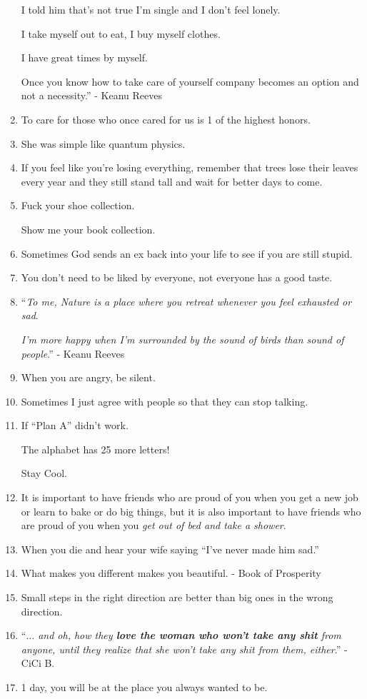 \documentclass{article}
\begin{document}
\begin{enumerate}
	I told him that's not true I'm single and I don't feel lonely.
	
	I take myself out to eat, I buy myself clothes.
	
	I have great times by myself.
	
	Once you know how to take care of yourself company becomes an option and not a necessity.'' - Keanu Reeves
	\item To care for those who once cared for us is 1 of the highest honors.
	\item She was simple like quantum physics.
	\item If you feel like you're losing everything, remember that trees lose their leaves every year and they still stand tall and wait for better days to come.
	\item Fuck your shoe collection.
	
	Show me your book collection.
	\item Sometimes God sends an ex back into your life to see if you are still stupid.
	\item You don't need to be liked by everyone, not everyone has a good taste.
	\item ``\textit{To me, Nature is a place where you retreat whenever you feel exhausted or sad}.
	
	\textit{I'm more happy when I'm surrounded by the sound of birds than sound of people}.'' - Keanu Reeves
	\item When you are angry, be silent.
	\item Sometimes I just agree with people so that they can stop talking.
	\item If ``Plan A'' didn't work.
	
	The alphabet has 25 more letters!
	
	Stay Cool.
	\item It is important to have friends who are proud of you when you get a new job or learn to bake or do big things, but it is also important to have friends who are proud of you when you \textit{get out of bed and take a shower}.
	\item When you die and hear your wife saying ``I've never made him sad.''
	\item What makes you different makes you beautiful. - Book of Prosperity
	\item Small steps in the right direction are better than big ones in the wrong direction.
	\item ``\textit{$\ldots$ and oh, how they \textbf{love the woman who won't take any shit} from anyone, until they realize that she won't take any shit from them, either}.'' - CiCi B.
	\item 1 day, you will be at the place you always wanted to be.
	

\end{enumerate}
\end{document}
